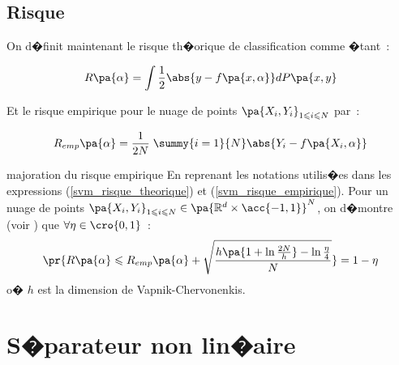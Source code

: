 \subsection{Risque}

On d�finit maintenant le risque th�orique de classification comme �tant~:

            \begin{eqnarray}
            R\pa{\alpha} = \int \frac{1}{2} \abs{y - f\pa{x,\alpha}} dP\pa{x,y}
            \label{svm_risque_theorique}
            \end{eqnarray}

Et le risque empirique pour le nuage de points $\pa{X_i,Y_i}_{1 \leqslant i \leqslant N}$ par~:

            \begin{eqnarray}
            R_{emp}\pa{\alpha} = \frac{1}{2N} \; \summy{i=1}{N} \abs{ Y_i - f\pa{X_i,\alpha}}
            \label{svm_risque_empirique}
            \end{eqnarray}

        \begin{xtheorem}{majoration du risque empirique}
        En reprenant les notations utilis�es dans les expressions 
        (\ref{svm_risque_theorique}) et (\ref{svm_risque_empirique}). Pour 
        un nuage de points  $\pa{X_i,Y_i}_{1 \leqslant i \leqslant N} \in \pa{\mathbb{R}^d \times \acc{-1,1} }^N$, 
        on d�montre (voir ) que $\forall \eta \in \cro{0,1}$~:
                    $$
                    \pr{ 
                    R\pa{\alpha} \leqslant R_{emp}\pa{\alpha} +
                            \sqrt{\frac    {h \pa{ 1+ \ln \frac{2N}{h} } - \ln \frac{\eta}{4} }
                                                    {N}
                            }
                    } = 1 - \eta
                    $$
        o� $h$ est la dimension de Vapnik-Chervonenkis.
        \end{xtheorem}
        





\section{S�parateur non lin�aire}



